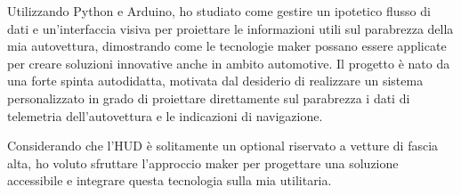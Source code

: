 Utilizzando Python e Arduino, ho studiato come gestire un ipotetico flusso di dati e un'interfaccia visiva per proiettare le informazioni utili sul parabrezza della mia autovettura, dimostrando come le tecnologie maker possano essere applicate per creare soluzioni innovative anche in ambito automotive.
Il progetto è nato da una forte spinta autodidatta, motivata dal desiderio di realizzare un sistema personalizzato in grado di proiettare direttamente sul parabrezza i dati di telemetria dell'autovettura e le indicazioni di navigazione.

Considerando che l'HUD è solitamente un optional riservato a vetture di fascia alta, ho voluto sfruttare l'approccio maker per progettare una soluzione accessibile e integrare questa tecnologia sulla mia utilitaria.